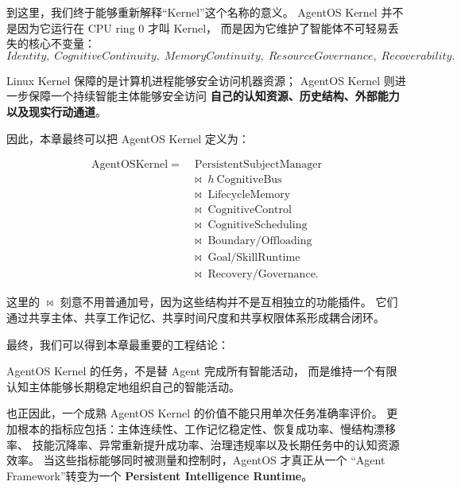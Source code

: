 到这里，我们终于能够重新解释``Kernel''这个名称的意义。
AgentOS Kernel 并不是因为它运行在 CPU ring 0 才叫 Kernel，
而是因为它维护了智能体不可轻易丢失的核心不变量：
\[
\boxed{
Identity,\;
CognitiveContinuity,\;
MemoryContinuity,\;
ResourceGovernance,\;
Recoverability.
}
\]

Linux Kernel 保障的是计算机进程能够安全访问机器资源；
AgentOS Kernel 则进一步保障一个持续智能主体能够安全访问
\textbf{自己的认知资源、历史结构、外部能力以及现实行动通道}。

因此，本章最终可以把 AgentOS Kernel 定义为：

\[
\boxed{
\begin{aligned}
\mathrm{AgentOSKernel}
=&\;
\mathrm{PersistentSubjectManager}
\\
&\bowtie\;
h\mathrm{\ CognitiveBus}
\\
&\bowtie\;
\mathrm{LifecycleMemory}
\\
&\bowtie\;
\mathrm{CognitiveControl}
\\
&\bowtie\;
\mathrm{CognitiveScheduling}
\\
&\bowtie\;
\mathrm{Boundary/Offloading}
\\
&\bowtie\;
\mathrm{Goal/SkillRuntime}
\\
&\bowtie\;
\mathrm{Recovery/Governance}.
\end{aligned}
}
\]

这里的 $\bowtie$ 刻意不用普通加号，因为这些结构并不是互相独立的功能插件。
它们通过共享主体、共享工作记忆、共享时间尺度和共享权限体系形成耦合闭环。

最终，我们可以得到本章最重要的工程结论：

\begin{conclusion}
AgentOS Kernel 的任务，不是替 Agent 完成所有智能活动，
而是维持一个有限认知主体能够长期稳定地组织自己的智能活动。
\end{conclusion}

也正因此，一个成熟 AgentOS Kernel 的价值不能只用单次任务准确率评价。
更加根本的指标应包括：主体连续性、工作记忆稳定性、恢复成功率、慢结构漂移率、
技能沉降率、异常重新提升成功率、治理违规率以及长期任务中的认知资源效率。
当这些指标能够同时被测量和控制时，AgentOS 才真正从一个
``Agent Framework''转变为一个
\textbf{Persistent Intelligence Runtime}。
